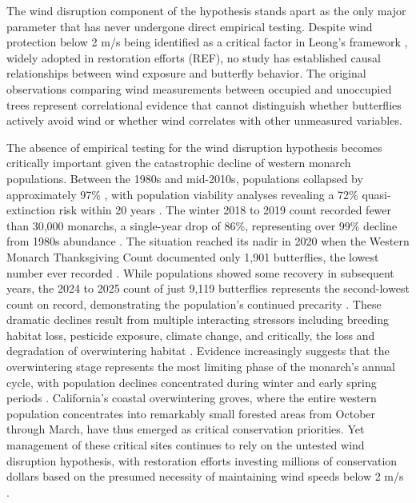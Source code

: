 The wind disruption component of the hypothesis stands apart as the only major parameter that has never undergone direct empirical testing. Despite wind protection below 2 m/s being identified as a critical factor in Leong's framework \citep{leongEvaluationManagementCalifornia2016}, widely adopted in restoration efforts (REF), no study has established causal relationships between wind exposure and butterfly behavior. The original observations comparing wind measurements between occupied and unoccupied trees represent correlational evidence that cannot distinguish whether butterflies actively avoid wind or whether wind correlates with other unmeasured variables.

The absence of empirical testing for the wind disruption hypothesis becomes critically important given the catastrophic decline of western monarch populations. Between the 1980s and mid-2010s, populations collapsed by approximately 97\% \citep{schultzCitizenScienceMonitoring2017}, with population viability analyses revealing a 72\% quasi-extinction risk within 20 years \citep{schultzCitizenScienceMonitoring2017}. The winter 2018 to 2019 count recorded fewer than 30,000 monarchs, a single-year drop of 86\%, representing over 99\% decline from 1980s abundance \citep{peltonWesternMonarchPopulation2019}. The situation reached its nadir in 2020 when the Western Monarch Thanksgiving Count documented only 1,901 butterflies, the lowest number ever recorded \citep{xercessocietyWesternMonarchThanksgiving2025}. While populations showed some recovery in subsequent years, the 2024 to 2025 count of just 9,119 butterflies represents the second-lowest count on record, demonstrating the population's continued precarity \citep{xercessocietyWesternMonarchThanksgiving2025}. These dramatic declines result from multiple interacting stressors including breeding habitat loss, pesticide exposure, climate change, and critically, the loss and degradation of overwintering habitat \citep{croneWhyMonarchButterflies2019,peltonWesternMonarchPopulation2019}. Evidence increasingly suggests that the overwintering stage represents the most limiting phase of the monarch's annual cycle, with population declines concentrated during winter and early spring periods \citep{peltonWesternMonarchPopulation2019}. California's coastal overwintering groves, where the entire western population concentrates into remarkably small forested areas from October through March, have thus emerged as critical conservation priorities. Yet management of these critical sites continues to rely on the untested wind disruption hypothesis, with restoration efforts investing millions of conservation dollars based on the presumed necessity of maintaining wind speeds below 2 m/s \citep{althouse&meadeinc.EllwoodMesaSperling2023,xercessocietyManagingMonarchsWest2018,peltonMonarchButterflyOverwintering2020,jepsenProtectingCaliforniasButterfly2017,weissAlbanyHillMonarch2018}.

